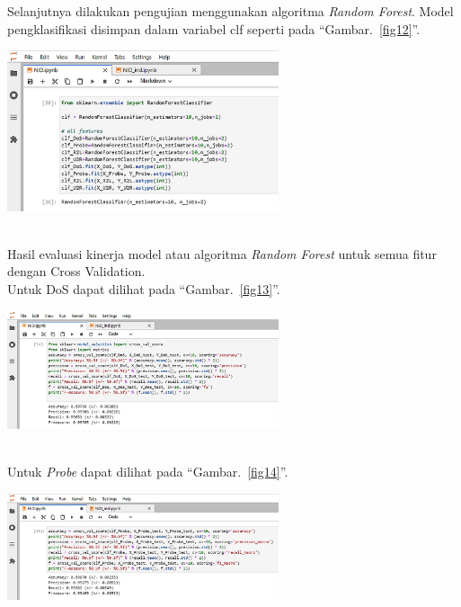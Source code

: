 \documentclass[conference]{IEEEtran}
\begin{document}
Selanjutnya dilakukan pengujian menggunakan algoritma \emph{Random Forest}. Model pengklasifikasi disimpan dalam variabel clf seperti pada ``Gambar.~\ref{fig12}''.\\

\begin{minipage}{\linewidth}
\centerline{\includegraphics[width=80mm]{Gambar/Gbr11.jpg}}
\label{fig12}
\end{minipage}\\

Hasil evaluasi kinerja model atau algoritma \emph{Random Forest} untuk semua fitur dengan Cross Validation.\\
Untuk DoS dapat dilihat pada ``Gambar.~\ref{fig13}''.\\

\begin{minipage}{\linewidth}
\centerline{\includegraphics[width=80mm]{Gambar/Gbr12.jpg}}
\label{fig13}
\end{minipage}\\

\noindent Untuk \emph{Probe} dapat dilihat pada ``Gambar.~\ref{fig14}''.\\

\begin{minipage}{\linewidth}
\centerline{\includegraphics[width=80mm]{Gambar/Gbr13.jpg}}
\label{fig14}
\end{minipage}\\
\end{document}

